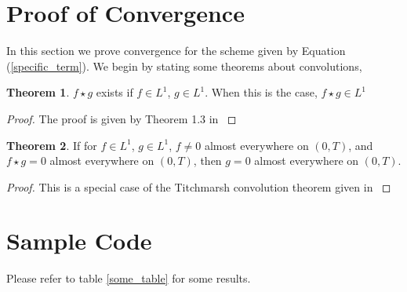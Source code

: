 \documentclass[11pt]{article}
\numberwithin{equation}{section}
\theoremstyle{definition}
\newtheorem{theorem}{Theorem}[section]
\newcommand{\eqr}[1]{Equation (\ref{#1})}
\begin{document}
\section{Proof of Convergence}
In this section we prove convergence for the scheme given by \eqr{specific_term}.
We begin by stating some theorems about convolutions,
\begin{theorem}
	\label{convolution_exists}
	$f \star g$ exists if $f \in L^1$, $g \in L^1$. When this is the case, $f \star g \in L^1$
\end{theorem}
\begin{proof}
The proof is given by Theorem 1.3 in \cite{stein71}
\end{proof}

\begin{theorem}
	\label{titchmarsh}
	If for $f \in L^1$, $g \in L^1$, $f \neq 0$ almost everywhere on $(0, T)$, and $f \star g = 0$ almost everywhere on $(0, T)$, then $g = 0$ almost everywhere on $(0, T)$.
\end{theorem}
\begin{proof}
This is a special case of the Titchmarsh convolution theorem given in \cite{titchmarsh}
\end{proof}


\section{Sample Code}
\lstset{caption=Basic Scheme}

\lstset{caption=Lubich Scheme}

Please refer to table \ref{some_table} for some results.
\end{document}
